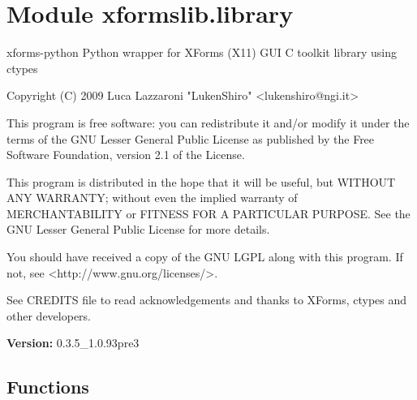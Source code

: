 %
%
%


\section{Module xformslib.library}

    \label{xformslib:library}
xforms-python Python wrapper for XForms (X11) GUI C toolkit library using 
ctypes

Copyright (C) 2009  Luca Lazzaroni "LukenShiro"  
{\textless}lukenshiro@ngi.it{\textgreater}

This program is free software: you can redistribute it and/or modify it 
under the terms of the GNU Lesser General Public License as published by 
the Free Software Foundation, version 2.1 of the License.

This program is distributed in the hope that it will be useful, but WITHOUT
ANY WARRANTY; without even the implied warranty of MERCHANTABILITY or 
FITNESS FOR A PARTICULAR PURPOSE. See the GNU Lesser General Public License
for more details.

You should have received a copy of the GNU LGPL along with this program. If
not, see {\textless}http://www.gnu.org/licenses/{\textgreater}.

See CREDITS file to read acknowledgements and thanks to XForms, ctypes and 
other developers.

\textbf{Version:} 0.3.5\_1.0.93pre3





  \subsection{Functions}

    \label{xformslib:library:get_xforms_version}


